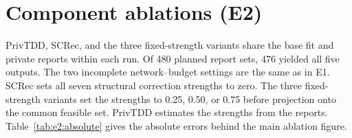 \documentclass[10pt,letterpaper]{article}
\begin{document}
\clearpage
\section{Component ablations (E2)}\label{sec:e2}
PrivTDD, SCRec, and the three fixed-strength variants share the base fit and private reports within each run.
Of 480 planned report sets, 476 yielded all five outputs. The two incomplete
network--budget settings are the same as in E1. SCRec sets all seven structural
correction strengths to zero. The three fixed-strength variants set the strengths
to 0.25, 0.50, or 0.75 before projection onto the common feasible set.
PrivTDD estimates the strengths from the reports. Table~\ref{tab:e2:absolute}
gives the absolute errors behind the main ablation figure.


\begingroup\fontsize{8.6}{10.2}\selectfont\setlength{\tabcolsep}{2.0pt}
\end{document}

